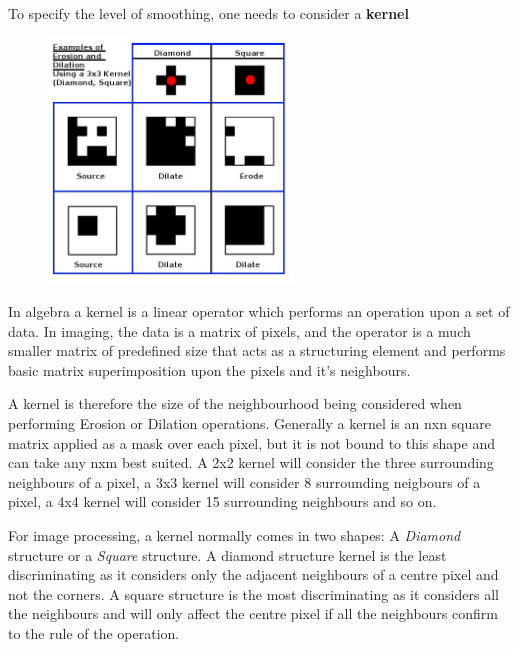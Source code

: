 \documentclass[11pt]{article} %
\begin{document}
{{To specify the level of smoothing, one needs to consider a {\bf kernel}

\begin{figure}
	\vspace{-10pt}
	\centering
	\includegraphics[width=0.58\textwidth]{../images/kernel}
	\vspace{-20pt}
	\caption{}\label{img:kernel}
	\vspace{-30pt}
\end{figure}

In algebra a kernel is a linear operator which performs an operation upon a set of data. In imaging, the data is a matrix of pixels, and the operator is a much smaller matrix of predefined size that acts as a structuring element and performs basic matrix superimposition upon the pixels and it's neighbours.

A kernel is therefore the size of the neighbourhood being considered when performing Erosion or Dilation operations. Generally a kernel is an nxn square matrix applied as a mask over each pixel, but it is not bound to this shape and can take any nxm best suited.
A 2x2 kernel will consider the three surrounding neighbours of a pixel, a 3x3 kernel will consider 8 surrounding neigbours of a pixel, a 4x4 kernel will consider 15 surrounding neighbours and so on.

For  image processing, a kernel normally comes in two shapes: A {\it Diamond} structure or a {\it Square} structure. A diamond structure kernel is the least discriminating as it considers only the adjacent neighbours of a centre pixel and not the corners. A square structure  is the most discriminating as it considers all the neighbours and will only affect the centre pixel if all the neighbours confirm to the rule of the operation.

}}
\end{document}
